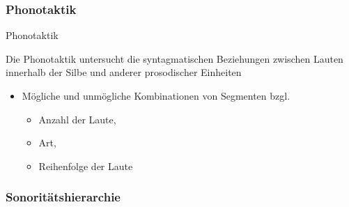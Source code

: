 \begin{frame}
\frametitle{Phonotaktik}

\begin{block}{Phonotaktik}

Die Phonotaktik untersucht die syntagmatischen Beziehungen zwischen Lauten innerhalb der Silbe und anderer prosodischer Einheiten \citep{Fuhrhop&Co13a}

\end{block}

\begin{itemize}
	\item Mögliche und unmögliche Kombinationen von Segmenten bzgl.
	
	\begin{itemize}
		\item Anzahl der Laute,
		\item Art,
		\item Reihenfolge der Laute
	\end{itemize}

\end{itemize}

\end{frame}



\subsubsection{Sonoritätshierarchie}

